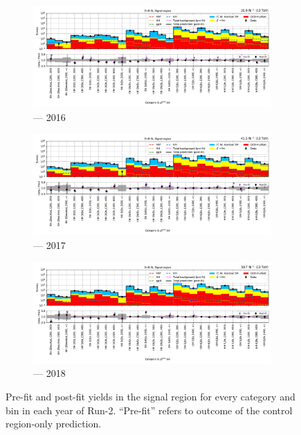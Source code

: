 \begin{figure}[htbp]
    \centering
    \begin{subfigure}[b]{0.9\textwidth}
        \includegraphics[width=\textwidth]{figures/mountain_ranges/2016/ttH/SR_tree_fit_s-abs_values_ttH_cats.pdf}
        \caption{\ttH --- 2016}
    \end{subfigure}

    \begin{subfigure}[b]{0.9\textwidth}
        \includegraphics[width=\textwidth]{figures/mountain_ranges/2017/ttH/SR_tree_fit_s-abs_values_ttH_cats.pdf}
        \caption{\ttH --- 2017}
    \end{subfigure}

    \begin{subfigure}[b]{0.9\textwidth}
        \includegraphics[width=\textwidth]{figures/mountain_ranges/2018/ttH/SR_tree_fit_s-abs_values_ttH_cats.pdf}
        \caption{\ttH --- 2018}
    \end{subfigure}
    \caption[Pre-fit and post-fit yields in the signal region for every \ttH category and \ptmiss bin in each year of Run-2]{Pre-fit and post-fit yields in the signal region for every \ttH category and \ptmiss bin in each year of Run-2. ``Pre-fit'' refers to outcome of the control region-only prediction.}
    \label{fig:htoinv_mountain_range_ttH_SR_Postfit}
\end{figure}

